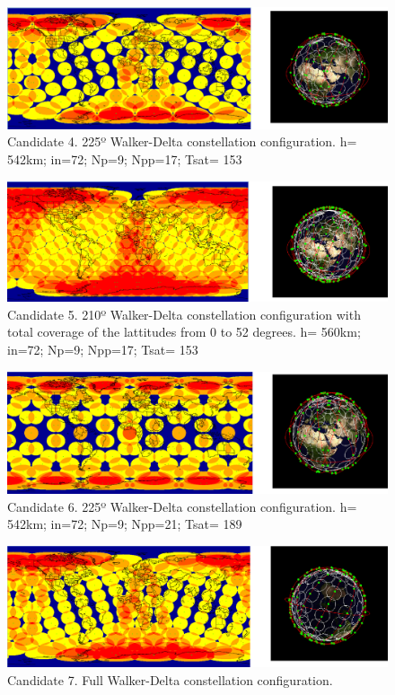 \begin{figure}[H] %
	\centering
	\includegraphics[width=1\textwidth]{Candidate4.png}
	\caption{Candidate 4. 225º Walker-Delta constellation configuration.
			 h= 542km; in=72; Np=9; Npp=17; Tsat= 153}
	\label{fig:Candidate4}
\end{figure}

\begin{figure}[H] %
	\centering
	\includegraphics[width=1\textwidth]{Candidate5.png}
	\caption{Candidate 5. 210º Walker-Delta constellation configuration with total coverage of the lattitudes from 0 to 52 degrees.
			 h= 560km; in=72; Np=9; Npp=17; Tsat= 153} 
	\label{fig:Candidate5}
\end{figure}

\begin{figure}[H] %
	\centering
	\includegraphics[width=1\textwidth]{Candidate6.png}
	\caption{Candidate 6. 225º Walker-Delta constellation configuration.
			 h= 542km; in=72; Np=9; Npp=21; Tsat= 189}
	\label{fig:Candidate6}
\end{figure}

\begin{figure}[H] %
	\centering
	\includegraphics[width=1\textwidth]{Candidate7.png}
	\caption{Candidate 7. Full Walker-Delta constellation configuration.}
	\label{fig:Candidate7}
\end{figure}


